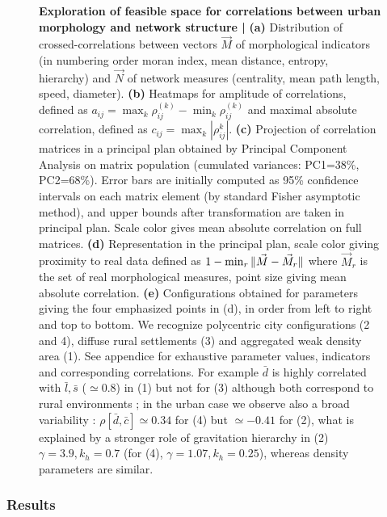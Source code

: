 \begin{figure}
\caption{\small\textbf{Exploration of feasible space for correlations between urban morphology and network structure | } \textbf{(a)} Distribution of crossed-correlations between vectors $\vec{M}$ of morphological indicators (in numbering order moran index, mean distance, entropy, hierarchy) and $\vec{N}$ of network measures (centrality, mean path length, speed, diameter). \textbf{(b)} Heatmaps for amplitude of correlations, defined as $a_{ij}=\max_k{\rho_{ij}^{(k)}}-\min_k{\rho_{ij}^{(k)}}$ and maximal absolute correlation, defined as $c_{ij}=\max_k\left| \rho_{ij}^{k} \right|$. \textbf{(c)} Projection of correlation matrices in a principal plan obtained by Principal Component Analysis on matrix population (cumulated variances: PC1=38\%, PC2=68\%). Error bars are initially computed as 95\% confidence intervals on each matrix element (by standard Fisher asymptotic method), and upper bounds after transformation are taken in principal plan. Scale color gives mean absolute correlation on full matrices. \textbf{(d)} Representation in the principal plan, scale color giving proximity to real data defined as $1 - \min_r \| \vec{M}-\vec{M}_r \|$ where $\vec{M}_r$ is the set of real morphological measures, point size giving mean absolute correlation. \textbf{(e)} Configurations obtained for parameters giving the four emphasized points in (d), in order from left to right and top to bottom. We recognize polycentric city configurations (2 and 4), diffuse rural settlements (3) and aggregated weak density area (1). See appendice for exhaustive parameter values, indicators and corresponding correlations. For example $\bar{d}$ is highly correlated with $\bar{l},\bar{s}$ ($\simeq$0.8) in (1) but not for (3) although both correspond to rural environments ; in the urban case we observe also a broad variability : $\rho[\bar{d},\bar{c}]\simeq 0.34$ for (4) but $\simeq-0.41$ for (2), what is explained by a stronger role of gravitation hierarchy in (2) $\gamma=3.9,k_h=0.7$ (for (4), $\gamma=1.07,k_h=0.25$), whereas density parameters are similar.}
\label{fig:densnwcor}
\end{figure}






\subsubsection{Results}

